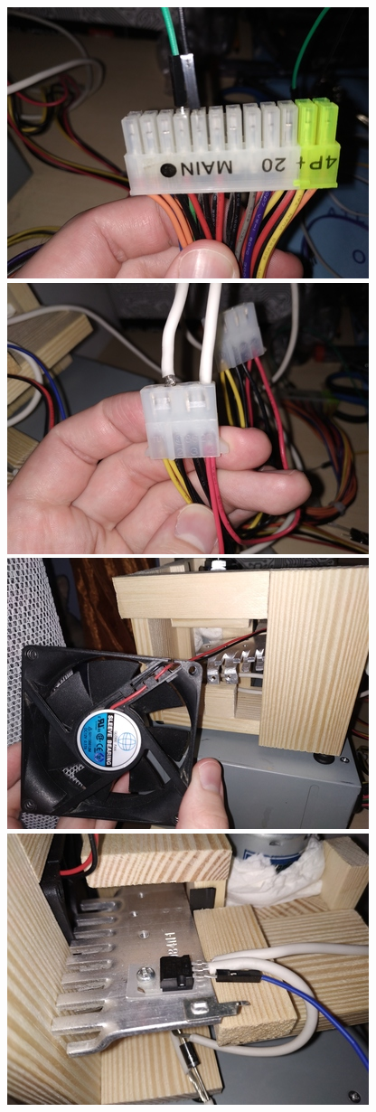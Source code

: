 \documentclass[a4paper,oneside,11pt]{report}
\begin{document}
\begin{enumerate}[1.]
\includegraphics[scale=0.5]{images/16.jpg} 
\includegraphics[scale=0.5]{images/17.jpg} 
\includegraphics[scale=0.5]{images/18.jpg} 
\includegraphics[scale=0.5]{images/19.jpg}

\end{enumerate}
\end{document}
